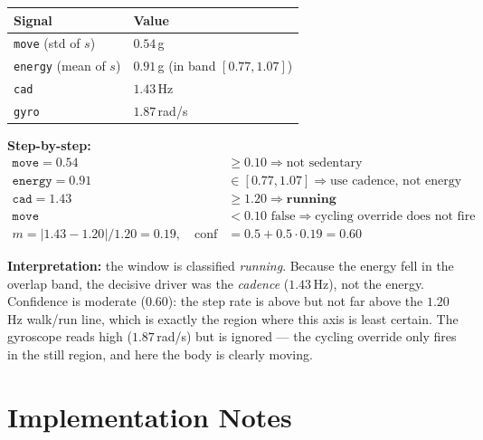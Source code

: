 \begin{center}
\begin{tabular}{@{}ll@{}}
\toprule
\textbf{Signal} & \textbf{Value} \\
\midrule
\texttt{move} (std of $s$)   & $0.54$\,g \\
\texttt{energy} (mean of $s$)& $0.91$\,g \;(in band $[0.77,1.07]$) \\
\texttt{cad}                 & $1.43$\,Hz \\
\texttt{gyro}                & $1.87$\,rad/s \\
\bottomrule
\end{tabular}
\end{center}

\noindent\textbf{Step-by-step:}
\begin{align*}
\texttt{move}=0.54 &\geq 0.10 \Rightarrow \text{not sedentary}\\
\texttt{energy}=0.91 &\in[0.77,1.07] \Rightarrow \text{use cadence, not energy}\\
\texttt{cad}=1.43 &\geq 1.20 \Rightarrow \textbf{running}\\
\texttt{move} &< 0.10 \text{ false} \Rightarrow \text{cycling override does not fire}\\
m = |1.43-1.20|/1.20 = 0.19,\quad
\text{conf} &= 0.5 + 0.5\cdot 0.19 = \mathbf{0.60}
\end{align*}

\begin{callout}
\textbf{Interpretation:} the window is classified \emph{running}. Because the energy fell in
the overlap band, the decisive driver was the \emph{cadence} ($1.43$\,Hz), not the energy.
Confidence is moderate ($0.60$): the step rate is above but not far above the $1.20$\,Hz
walk/run line, which is exactly the region where this axis is least certain. The gyroscope
reads high ($1.87$\,rad/s) but is ignored --- the cycling override only fires in the still
region, and here the body is clearly moving.
\end{callout}

\section{Implementation Notes}


